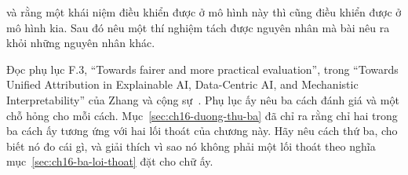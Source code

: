 \begin{cauhoids}
và rằng một khái niệm điều khiển được ở mô hình này thì cũng điều khiển được ở
mô hình kia. Sau đó nêu một thí nghiệm tách được nguyên nhân mà bài nêu ra khỏi
những nguyên nhân khác.
  \item Đọc phụ lục F.3, \enquote{Towards fairer and more practical evaluation},
trong \enquote{Towards Unified Attribution in Explainable AI, Data-Centric AI,
and Mechanistic Interpretability} của Zhang và cộng sự~\autocite{p18unified}.
Phụ lục ấy nêu ba cách đánh giá và một chỗ hỏng cho mỗi cách.
Mục~\ref{sec:ch16-duong-thu-ba} đã chỉ ra rằng chỉ hai trong ba cách ấy tương
ứng với hai lối thoát của chương này. Hãy nêu cách thứ ba, cho biết nó đo cái gì,
và giải thích vì sao nó không phải một lối thoát theo nghĩa
mục~\ref{sec:ch16-ba-loi-thoat} đặt cho chữ ấy.
\end{cauhoids}
